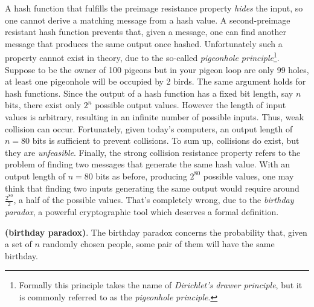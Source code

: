 \bigskip
\noindent
A hash function that fulfills the preimage resistance property \textit{hides} the input, so one cannot derive a matching message from a hash value. A second-preimage resistant hash function prevents that, given a message, one can find another message that produces the same output once hashed. Unfortunately such a property cannot exist in theory, due to the so-called \textit{pigeonhole principle}\footnote{Formally this principle takes the name of \textit{Dirichlet's drawer principle}, but it is commonly referred to as the \textit{pigeonhole principle}.}. Suppose to be the owner of 100 pigeons but in your pigeon loop are only 99 holes, at least one pigeonhole will be occupied by 2 birds. The same argument holds for hash functions. Since the output of a hash function has a fixed bit length, say $n$ bits, there exist only $2^{n}$ possible output values. However the length of input values is arbitrary, resulting in an infinite number of possible inputs. Thus, weak collision can occur. Fortunately, given today's computers, an output length of $n=80$ bits is sufficient to prevent collisions. To sum up, collisions do exist, but they are \textit{unfeasible}. Finally, the strong collision resistance property refers to the problem of finding two messages that generate the same hash value. With an output length of $n=80$ bits as before, producing $2^{80}$ possible values, one may think that finding two inputs generating the same output would require around $\frac{2^{80}}{2}$, a half of the possible values. That's completely wrong, due to the \textit{birthday paradox}, a powerful cryptographic tool which deserves a formal definition.
\begin{mydef} {\bf (birthday paradox)}.
    The birthday paradox concerns the probability that, given a set of $n$ randomly chosen people, some pair of them will have the same birthday.
\end{mydef}

